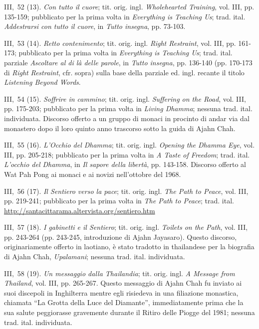 III,~52 (13). \emph{Con tutto il cuore}; tit. orig. ingl.
\emph{Wholehearted Training}, vol. III, pp. 135-159; pubblicato per la
prima volta in \emph{Everything is Teaching Us}; trad. ital.
\emph{Addestrarsi con tutto il cuore}, in \emph{Tutto insegna}, pp.
73-103.

III,~53 (14). \emph{Retto contenimento}; tit. orig. ingl. \emph{Right
Restraint}, vol. III, pp. 161-173; pubblicato per la prima volta in
\emph{Everything is Teaching Us}; trad. ital. parziale \emph{Ascoltare
al di là delle parole}, in \emph{Tutto insegna}, pp. 136-140 (pp.
170-173 di \emph{Right} \emph{Restraint}, cfr. sopra) sulla base della
parziale ed. ingl. recante il titolo \emph{Listening Beyond Words}.

III,~54 (15). \emph{Soffrire in cammino}; tit. orig. ingl.
\emph{Suffering on the Road}, vol. III, pp. 175-203; pubblicato per la
prima volta in \emph{Living Dhamma}; nessuna trad. ital. individuata.
Discorso offerto a un gruppo di monaci in procinto di andar via dal
monastero dopo il loro quinto anno trascorso sotto la guida di Ajahn
Chah.

III,~55 (16). \emph{L'Occhio del Dhamma}; tit. orig. ingl. \emph{Opening
the Dhamma Eye}, vol. III, pp. 205-218; pubblicato per la prima volta in
\emph{A Taste of Freedom}; trad. ital. \emph{L'occhio del Dhamma}, in
\emph{Il sapore della libertà}, pp. 143-158. Discorso offerto al Wat Pah
Pong ai monaci e ai novizi nell'ottobre del 1968.

III,~56 (17). \emph{Il Sentiero verso la pace}; tit. orig. ingl.
\emph{The Path to Peace}, vol. III, pp. 219-241; pubblicato per la prima
volta in \emph{The Path to Peace}; trad. ital.
\url{http://santacittarama.altervista.org/sentiero.htm}

III,~57 (18). \emph{I gabinetti e il Sentiero}; tit. orig. ingl.
\emph{Toilets on the Path}, vol. III, pp. 243-264 (pp. 243-245,
introduzione di Ajahn Jayasaro). Questo discorso, originariamente
offerto in laotiano, è stato tradotto in thailandese per la biografia di
Ajahn Chah, \emph{Upalamani}; nessuna trad. ital. individuata.

III,~58 (19). \emph{Un messaggio dalla Thailandia}; tit. orig. ingl.
\emph{A Message from Thailand}, vol. III, pp. 265-267. Questo messaggio
di Ajahn Chah fu inviato ai suoi discepoli in Inghilterra mentre egli
risiedeva in una filiazione monastica, chiamata ``La Grotta della Luce
del Diamante'', immediatamente prima che la sua salute peggiorasse
gravemente durante il Ritiro delle Piogge del 1981; nessuna trad. ital.
individuata.
